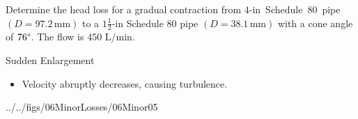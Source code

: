 \documentclass[9pt,xcolor={svgnames, x11names},professionalfonts, mathserif]{beamer}
\begin{document}

\begin{frame}
 \centering
 \begin{myexam}[width=0.95\textwidth]{}{}
  \raggedright
  Determine the head loss for a gradual contraction from $4\text{-in}$~Schedule~$80$~pipe $(D=97.2\,\text{mm})$ to a
  $1\tfrac{1}{2}\text{-in}$ Schedule $80$ pipe $(D=38.1\,\text{mm})$ with a cone angle of $76\degree$. The flow is $450\text{ L/min}$.
 \end{myexam}

\end{frame}


\begin{frame}{Sudden Enlargement}

 \begin{itemize}
  \item Velocity abruptly decreases, causing turbulence.
 \end{itemize}
 \begin{cfig}[0.35]{../../figs/06MinorLosses/06Minor05}\end{cfig}

\end{frame}
\end{document}
